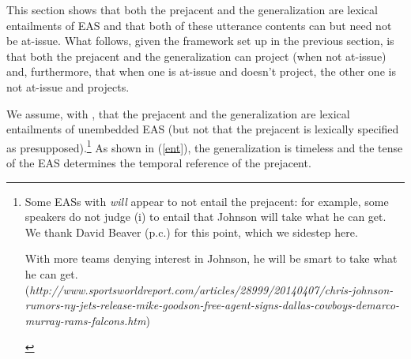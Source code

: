 \documentclass[11pt,fleqn]{article}
\newcommand{\6}{\mbox{$[\hspace*{-.6mm}[$}}
\newcommand{\9}{\mbox{$]\hspace*{-.6mm}]$}}
\begin{document}
This section shows that both the prejacent and the generalization are lexical entailments of EAS and that both of these utterance contents can but need not be at-issue. What follows, given the framework set up in the previous section, is that both the prejacent and the generalization can project (when not at-issue) and, furthermore, that when one is at-issue and doesn't project, the other one is not at-issue and projects. 

We assume, with \citealt{barker02}, that the prejacent and the generalization are lexical entailments of unembedded EAS (but not that the prejacent is lexically specified as presupposed).\footnote{Some EASs with {\em will} appear to not entail the prejacent: for example, some speakers do not judge (i) to entail that Johnson will take what he can get. We thank David Beaver (p.c.) for this point, which we sidestep here.
\begin{exe}
 With more teams denying interest in Johnson, he will be smart
to take what he can get. \\ ({\em http://www.sportsworldreport.com/articles/28999/20140407/chris-johnson-rumors-ny-jets-release-mike-goodson-free-agent-signs-dallas-cowboys-demarco-murray-rams-falcons.htm})
\end{exe}}   As shown in (\ref{ent}), the generalization is timeless and the tense of the EAS determines the temporal reference of the prejacent. 
\end{document}
